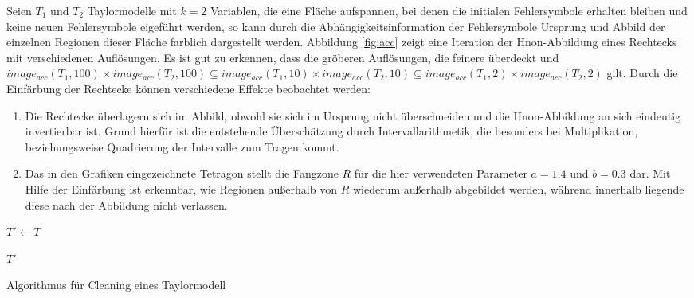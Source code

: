 Seien $T_1$ und $T_2$ Taylormodelle mit $k=2$ Variablen, die eine Fläche aufspannen, bei denen die initialen Fehlersymbole erhalten bleiben und keine neuen Fehlersymbole eigeführt werden, so kann durch die Abhängigkeitsinformation der Fehlersymbole Ursprung und Abbild der einzelnen Regionen dieser Fläche farblich dargestellt werden. Abbildung \ref{fig:acc} zeigt eine Iteration der H\e non-Abbildung eines Rechtecks mit verschiedenen Auflösungen. Es ist gut zu erkennen, dass die gröberen Auflösungen, die feinere überdeckt und $image_{acc}(T_1,100)\times image_{acc}(T_2,100) \subseteq image_{acc}(T_1,10)\times image_{acc}(T_2,10) \subseteq image_{acc}(T_1,2)\times image_{acc}(T_2,2) $ gilt. Durch die Einfärbung der Rechtecke können verschiedene Effekte beobachtet werden:
\begin{enumerate}
 \item Die Rechtecke überlagern sich im Abbild, obwohl sie sich im Ursprung nicht überschneiden und die H\e non-Abbildung an sich eindeutig invertierbar ist. Grund hierfür ist die entstehende Überschätzung durch Intervallarithmetik, die besonders bei Multiplikation, beziehungsweise Quadrierung der Intervalle zum Tragen kommt.
 \item Das in den Grafiken eingezeichnete Tetragon stellt die Fangzone $R$ für die hier verwendeten Parameter $a=1.4$ und $b=0.3$ dar. Mit Hilfe der Einfärbung ist erkennbar, wie Regionen außerhalb von $R$ wiederum außerhalb abgebildet werden, während innerhalb liegende diese nach der Abbildung nicht verlassen.
\end{enumerate}



\begin{algorithm}[tbh]
\label{algo:clean}
\SetAlgoLined
{}
\DontPrintSemicolon
$T' \gets T$ 

\Return $T'$ 
 \caption{Algorithmus für Cleaning eines Taylormodell}
\end{algorithm}



